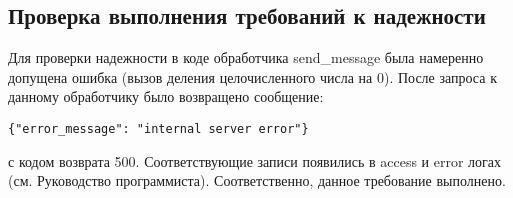\documentclass[testmethods]{espd}
\begin{document}
\subsection{Проверка выполнения требований к надежности}
Для проверки надежности в коде обработчика send\_message была намеренно допущена ошибка (вызов деления целочисленного числа на 0). После запроса к данному обработчику было возвращено сообщение:

\begin{verbatim}
{"error_message": "internal server error"}
\end{verbatim}

с кодом возврата 500. Соответствующие записи появились в access и error логах (см. Руководство программиста). Соответственно, данное требование выполнено.


\end{document}
